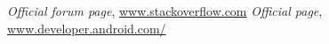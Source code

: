 \begin{thebibliography}{99999}
\singlespace\normalsize


 \textit{ Official forum page}, \url{www.stackoverflow.com}
 \textit{ Official page}, \url{www.developer.android.com/}



\end{thebibliography}
